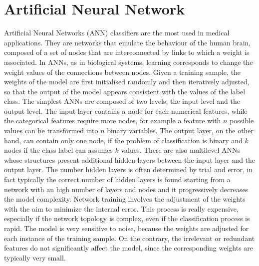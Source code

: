 \documentclass[final,a4paper,12pt,english]{UnicaPhdThesis3}
\begin{document}
	\section{Artificial Neural Network} \label{ANN}
	Artificial Neural Networks (\acs{ANN}) classifiers are the most used in medical applications. They are networks that emulate the behaviour of the human brain, composed of a set of nodes that are interconnected by links to which a weight is associated. In ANNs, as in biological systems, learning corresponds to change the weight values of the connections between nodes. Given a training sample, the weights of the model are first initialised randomly and then iteratively adjusted, so that the output of the model appears consistent with the values of the label class. The simplest ANNs are composed of two levels, the input level and the output level. The input layer contains a node for each numerical features, while the categorical features require more nodes, for example a feature with $n$ possible values can be transformed into $n$ binary variables. The output layer, on the other hand, can contain only one node, if the problem of classification is binary and $k$ nodes if the class label can assumes $k$ values. There are also multilevel ANNs whose structures present additional hidden layers between the input layer and the output layer. The number hidden layers is often determined by trial and error, in fact typically the correct number of hidden layers is found starting from a network with an high number of layers and nodes and it progressively decreases the model complexity. Network training involves the adjustment of the weights with the aim to minimize the internal error. This process is really expensive, especially if the network topology is complex, even if the classification process is rapid. The model is very sensitive to noise, because the weights are adjusted for each instance of the training sample. On the contrary, the irrelevant or redundant  features do not significantly affect the model, since the corresponding weights are typically very small.
	
\end{document}

